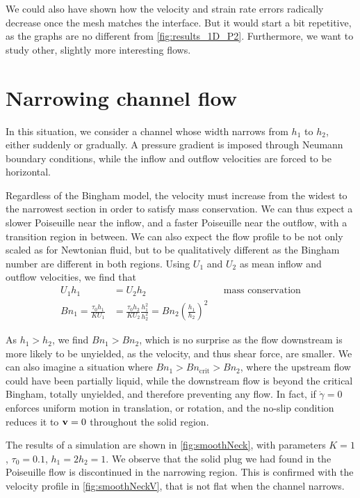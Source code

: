 \documentclass[11 pt]{report}
\begin{document}
We could also have shown how the velocity and strain rate errors radically decrease once the mesh matches the interface. But it would start a bit repetitive, as the graphs are no different from \cref{fig:results_1D_P2}. Furthermore, we want to study other, slightly more interesting flows.

\section{Narrowing channel flow}
In this situation, we consider a channel whose width narrows from $h_1$ to $h_2$, either suddenly or gradually. A pressure gradient is imposed through Neumann boundary conditions, while the inflow and outflow velocities are forced to be horizontal.

Regardless of the Bingham model, the velocity must increase from the widest to the narrowest section in order to satisfy mass conservation. We can thus expect a slower Poiseuille near the inflow, and a faster Poiseuille near the outflow, with a transition region in between. We can also expect the flow profile to be not only scaled as for Newtonian fluid, but to be qualitatively different as the Bingham number are different in both regions. Using $U_1$ and $U_2$ as mean inflow and outflow velocities, we find that
\begin{equation}
    \begin{aligned}
        U_1 h_1 &= U_2 h_2 &&\text{mass conservation}\\
        Bn_{1} = \frac{\tau_0 h_1}{K U_1} &= \frac{\tau_0 h_2}{K U_2} \frac{h_1^2}{h_2^2} = Bn_{2} \left(\frac{h_1}{h_2}\right)^2
    \end{aligned}
\end{equation}

As $h_1>h_2$, we find $Bn_1>Bn_2$, which is no surprise as the flow downstream is more likely to be unyielded, as the velocity, and thus shear force, are smaller. We can also imagine a situation where $Bn_1>Bn_{\text{crit}}>Bn_2$, where the upstream flow could have been partially liquid, while the downstream flow is beyond the critical Bingham, totally unyielded, and therefore preventing any flow. In fact, if $\dot\gamma=0$ enforces uniform motion in translation, or rotation, and the no-slip condition reduces it to $\mathbf{v}=0$ throughout the solid region.

The results of a simulation are shown in \cref{fig:smoothNeck}, with parameters $K=1$, $\tau_0=0.1$, $h_1=2h_2=1$. We observe that the solid plug we had found in the Poiseuille flow is discontinued in the narrowing region. This is confirmed with the velocity profile in \cref{fig:smoothNeckV}, that is not flat when the channel narrows. 
\end{document}
